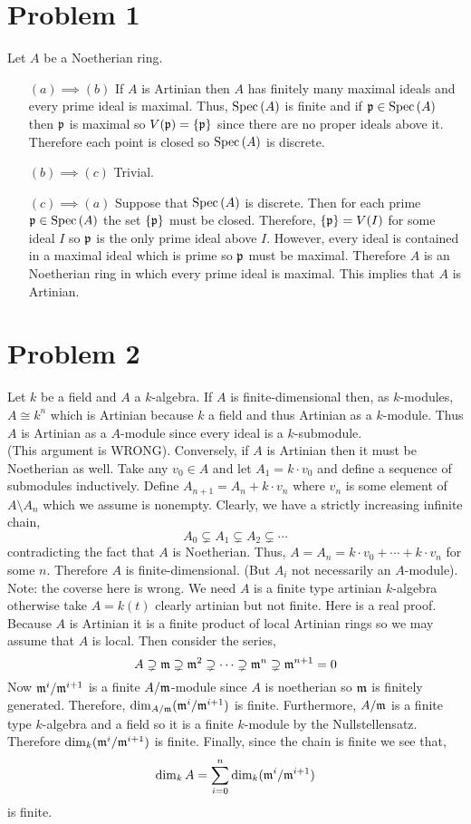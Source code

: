 \documentclass[12pt]{extarticle}
\begin{document}
 
\section{Problem 1}
Let $A$ be a Noetherian ring. 
\begin{enumerate}
\item[$(a) \implies (b)$]
If $A$ is Artinian then $A$ has finitely many maximal ideals and every prime ideal is maximal. Thus, $\mathrm{Spec}\left( A \right)$ is finite and if $\mathfrak{p} \in \mathrm{Spec}\left( A \right)$ then $\mathfrak{p}$ is maximal so $V(\mathfrak{p}) = \{ \mathfrak{p} \}$ since there are no proper ideals above it. Therefore each point is closed so $\mathrm{Spec}\left( A \right)$ is discrete. 
\item[$(b) \implies (c)$]
Trivial.
\item[$(c) \implies (a)$]
Suppose that $\mathrm{Spec}\left( A \right)$ is discrete. Then for each prime $\mathfrak{p} \in \mathrm{Spec}\left( A \right)$ the set $\{ \mathfrak{p} \}$ must be closed. Therefore, $\{ \mathfrak{p} \} = V(I)$ for some ideal $I$ so $\mathfrak{p}$ is the only prime ideal above $I$. However, every ideal is contained in a maximal ideal which is prime so $\mathfrak{p}$ must be maximal. Therefore $A$ is an Noetherian ring in which every prime ideal is maximal. This implies that $A$ is Artinian. 
\end{enumerate}

\section{Problem 2}

Let $k$ be a field and $A$ a $k$-algebra. If $A$ is finite-dimensional then, as $k$-modules, $A \cong k^n$ which is Artinian because $k$ a field and thus Artinian as a $k$-module. Thus $A$ is Artinian as a $A$-module since every ideal is a $k$-submodule. 
\bigskip\\
(This argument is WRONG). Conversely, if $A$ is Artinian then it must be Noetherian as well. Take any $v_0 \in A$ and let $A_1 = k \cdot v_0$ and define a sequence of submodules inductively. Define $A_{n+1} = A_n + k \cdot v_n$ where $v_n$ is some element of $A \setminus A_n$ which we assume is nonempty. Clearly, we have a strictly increasing infinite chain,
\[ A_0 \subsetneq A_1 \subsetneq A_2 \subsetneq \cdots \]
contradicting the fact that $A$ is Noetherian. Thus, $A = A_n = k \cdot v_0 + \cdots + k \cdot v_n$ for some $n$. Therefore $A$ is finite-dimensional. (But $A_i$ not necessarily an $A$-module).
\bigskip\\
Note: the coverse here is wrong. We need $A$ is a finite type artinian $k$-algebra otherwise take $A = k(t)$ clearly artinian but not finite. Here is a real proof. Because $A$ is Artinian it is a finite product of local Artinian rings so we may assume that $A$ is local. Then consider the series,
\[ A \supsetneq \mathfrak{m} \supsetneq \mathfrak{m}^2 \supsetneq \cdots \supsetneq \mathfrak{m}^{n} \supsetneq \mathfrak{m}^{n+1} = 0 \]
Now $\mathfrak{m}^i / \mathfrak{m}^{i+1}$ is a finite $A / \mathfrak{m}$-module since $A$ is noetherian so $\mathfrak{m}$ is finitely generated. Therefore, $\dim_{A/\mathfrak{m}}(\mathfrak{m}^{i}/\mathfrak{m}^{i+1})$ is finite. Furthermore, $A / \mathfrak{m}$ is a finite type $k$-algebra and a field so it is a finite $k$-module by the Nullstellensatz. Therefore $\dim_{k} (\mathfrak{m}^i / \mathfrak{m}^{i+1})$ is finite. Finally, since the chain is finite we see that,
\[ \dim_k A = \sum_{i = 0}^n \dim_{k} (\mathfrak{m}^i / \mathfrak{m}^{i+1}) \]
is finite.  
\end{document}
